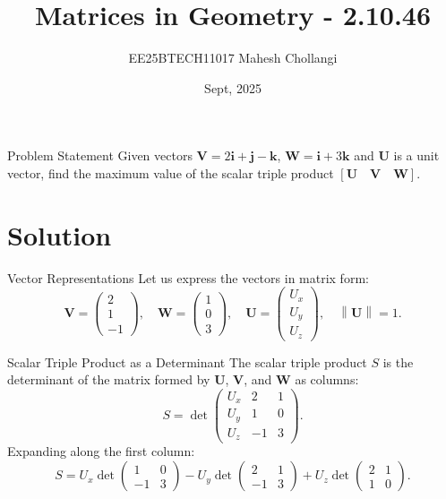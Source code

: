 \documentclass{beamer}
\title{Matrices in Geometry - 2.10.46}
\author{EE25BTECH11017 Mahesh Chollangi}
\date{Sept, 2025}
\let\vec\mathbf
\providecommand{\sbrak}[1]{\ensuremath{{}\left[#1\right]}}
\theoremstyle{remark}
\providecommand{\norm}[1]{\left\lVert#1\right\rVert}
\newcommand{\myvec}[1]{\ensuremath{\begin{pmatrix}#1\end{pmatrix}}}
\begin{document}
\maketitle

\frame{\titlepage}
\begin{frame}{Problem Statement}
    Given vectors  $\vec{V} = 2\vec{i} + \vec{j} - \vec{k}$,  $\vec{W} = \vec{i} + 3\vec{k}$
    and $\vec{U}$ is a unit vector, find the maximum value of the scalar triple product 
    $\sbrak{\vec{U} \quad \vec{V} \quad \vec{W}}$.
\end{frame}

\section*{Solution}
\begin{frame}{Vector Representations}
    Let us express the vectors in matrix form:
    \begin{equation}
    \vec{V} = \myvec{2 \\ 1 \\ -1}, \quad \vec{W} = \myvec{1 \\ 0 \\ 3}, \quad \vec{U} = \myvec{U_x \\ U_y \\ U_z}, \quad \norm{\vec{U}} = 1.
    \label{eq:vec_def}
    \end{equation}
\end{frame}

\begin{frame}{Scalar Triple Product as a Determinant}
    The scalar triple product \(S\) is the determinant of the matrix formed by \(\vec{U}\), \(\vec{V}\), and \(\vec{W}\) as columns:
    \begin{equation}
    S = \det \begin{pmatrix}
        U_x & 2 & 1 \\
        U_y & 1 & 0 \\
        U_z & -1 & 3
    \end{pmatrix}.
    \label{eq:scalar_trip_det}
    \end{equation}
    Expanding along the first column:
    \begin{equation}
    S = U_x \det\myvec{1 & 0 \\ -1 & 3} - U_y \det\myvec{2 & 1 \\ -1 & 3} + U_z \det\myvec{2 & 1 \\ 1 & 0}.
    \label{eq:det_expansion}
    \end{equation}
\end{frame}
\end{document}
